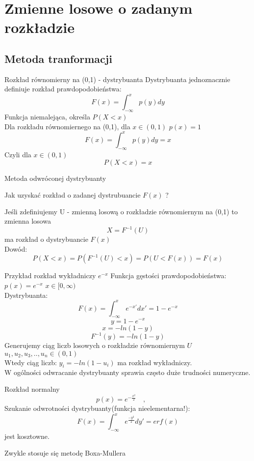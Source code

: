 \section{Zmienne losowe o zadanym rozkładzie}
\subsection{Metoda  tranformacji}
\begin{frame}{Rozkład równomierny na (0,1) - dystrybuanta}
    Dystrybuanta jednoznacznie definiuje rozkład prawdopodobieństwa:
$$
F(x)=\int_{-\infty}^{x}{p(y)dy}
$$
Funkcja niemalejąca, określa  $P(X<x)$\\
Dla rozkładu równomiernego na (0,1), dla
$x\in (0,1)$ $p(x)=1$
$$
F(x)=\int_{-\infty}^{x}{p(y)dy}=x
$$
Czyli dla $x \in (0,1)$
$$P(X<x)=x$$
\end{frame}
\begin{frame}{Metoda odwróconej dystrybuanty}


Jak uzyskać rozkład o zadanej dystrubuancie $F(x)$ ?

Jeśli zdefiniujemy U - zmienną losową o rozkładzie równomiernym na (0,1) to zmienna losowa
$$
X=F^{-1}(U)
$$
ma rozkład o dystrybuancie $F(x)$\\

Dowód:
$$
P(X<x)= P(F^{-1}(U)<x
)=P(U<F(x))=F(x)
$$

\end{frame}
\begin{frame}{Przykład rozkład wykładniczy $e^{-x}$}
Funkcja gęstości prawdopodobieństwa:    
    $p(x)=e^{-x}$ $x \in [0,\infty)$\\
    
Dystrybuanta:
$$
F(x)=\int_{-\infty}^x{e^{-x'}dx'}=1-e^{-x}
$$
$$
y=1-e^{-x}
$$
$$
x=-ln(1-y)
$$
$$
F^{-1}(y)=-ln(1-y)
$$
Generujemy ciąg liczb losowych o rozkładzie równomiernym $U$ $u_1, u_2, u_3, .., u_n \in (0,1)$\\
Wtedy ciąg liczb:
$y_i=-ln(1-u_i)$
ma rozkład wykładniczy.\\
W ogólności odwracanie dystrybuanty sprawia często duże trudności numeryczne. 
\end{frame}
\begin{frame}{Rozkład normalny}
    $$p(x) = e^{-\frac{x^{2}}{2}} \quad, \qquad$$
    Szukanie odwrotności dystrybuanty(funkcja nieelementarna!):
    $$F(x)=\int_{-\infty}^{x}e^{\frac{-y^2}{2}}dy'=erf(x) $$
    jest kosztowne.
    
    Zwykle stosuje się metodę Boxa-Mullera 
\end{frame}

